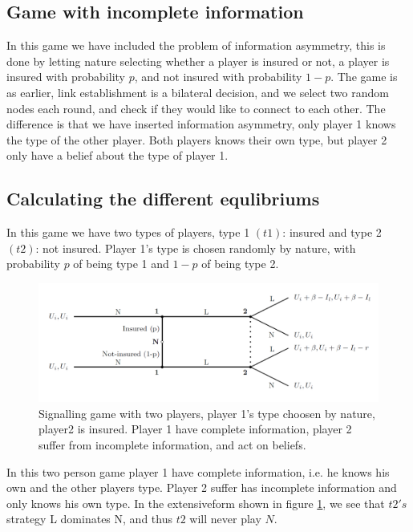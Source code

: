\subsection{Game with incomplete information}
In this game we have included the problem of information asymmetry, this is done by letting nature selecting whether a player is insured or not, a player is insured with probability $p$, and not insured with probability $1-p$. 
The game is as earlier, link establishment is a bilateral decision, and we select two random nodes each round, and check if they would like to connect to each other. The difference is that we have inserted information asymmetry, only player 1 knows the type of the other player. Both players knows their own type, but player 2 only have a belief about the type of player 1.

\subsection{Calculating the different equlibriums}
In this game we have two types of players, type 1 $(t1)$: insured and type 2 $(t2)$: not insured. 
Player 1's type is chosen randomly by nature, with probability $p$ of being type 1 and $1-p$ of being type 2.
\begin{figure}[h]
\centering

  \centering
\includegraphics[width=1\linewidth]{../Figures/SignalingGameInsured.png}

\caption{Signalling game with two players, player 1's type choosen by nature, player2 is insured. Player 1 have complete information, player 2 suffer from incomplete information, and act on beliefs. \label{fig:signalingInsured}}

\end{figure}
In this two person game player 1 have complete information, i.e. he knows his own and the other players type. Player 2 suffer has incomplete information and only knows his own type. 
In the extensiveform shown in figure \ref{fig:signalingInsured}, we see that $t2's$ strategy L dominates N, and thus $t2$ will never play $N$.
